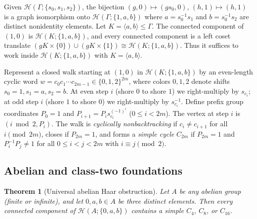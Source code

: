 \documentclass[11pt]{amsart}
\newtheorem{theorem}{Theorem}[section]
\theoremstyle{definition}
\theoremstyle{remark}
\newcommand{\Haar}{\mathcal{H}}
\begin{document}
Given $\Haar(\Gamma; \{s_0, s_1, s_2\})$, the bijection $(g, 0) \mapsto (g s_0, 0)$, $(h, 1) \mapsto (h, 1)$ is a graph isomorphism onto $\Haar(\Gamma; \{1, a, b\})$ where $a = s_0^{-1} s_1$ and $b = s_0^{-1} s_2$ are distinct nonidentity elements. Let $K = \langle a, b \rangle \le \Gamma$. The connected component of $(1,0)$ is $\Haar(K; \{1, a, b\})$, and every connected component is a left coset translate $(gK \times \{0\}) \cup (gK \times \{1\}) \cong \Haar(K; \{1, a, b\})$. Thus it suffices to work inside $\Haar(K; \{1,a,b\})$ with $K = \langle a, b \rangle$.

Represent a closed walk starting at $(1,0)$ in $\Haar(K; \{1, a, b\})$ by an even-length cyclic word $w = c_0 c_1 \cdots c_{2m-1} \in \{0,1,2\}^{2m}$, where colors $0, 1, 2$ denote shifts $s_0 = 1, s_1 = a, s_2 = b$. At even step $i$ (shore $0$ to shore $1$) we right-multiply by $s_{c_i}$; at odd step $i$ (shore $1$ to shore $0$) we right-multiply by $s_{c_i}^{-1}$. Define prefix group coordinates $P_0 = 1$ and $P_{i+1} = P_i s_{c_i}^{(-1)^i}$ ($0 \le i < 2m$). The vertex at step $i$ is $(i \bmod 2, P_i)$. The walk is \emph{cyclically nonbacktracking} if $c_i \ne c_{i+1}$ for all $i \pmod{2m}$, closes if $P_{2m} = 1$, and forms a \emph{simple cycle} $C_{2m}$ if $P_{2m} = 1$ and $P_i^{-1} P_j \ne 1$ for all $0 \le i < j < 2m$ with $i \equiv j \pmod 2$.

\subsection{Abelian and class-two foundations}

\begin{theorem}[Universal abelian Haar obstruction]\label{thm:abelian}
Let $A$ be any abelian group (finite or infinite), and let $0, a, b \in A$ be three distinct elements. Then every connected component of $\Haar(A; \{0, a, b\})$ contains a simple $C_4$, $C_8$, or $C_{16}$.
\end{theorem}
\end{document}
